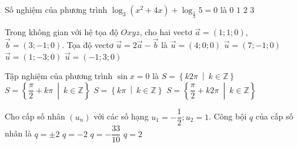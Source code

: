 \begin{ex}%
	Số nghiệm của phương trình $\log_3(x^2 + 4x) + \log_{\frac{1}{3}} 5 = 0$ là
	\choice
	{$0$}
	{$1$}
	{\True $2$}
	{$3$}
\end{ex}

\begin{ex}%
	Trong không gian với hệ tọa độ $Oxyz$, cho hai vectơ $\vec{a} = (1;1;0)$, $\vec{b} = (3;-1;0)$. Tọa độ vectơ $\vec{u} = 2\vec{a} - \vec{b}$ là
	\choice
	{$\vec{u} = (4;0;0)$}
	{$\vec{u} = (7;-1;0)$}
	{$\vec{u} = (1;-3;0)$}
	{\True $\vec{u} = (-1;3;0)$}
\end{ex}

\begin{ex}%
	Tập nghiệm của phương trình $\sin x = 0$ là
	\choice
	{$S = \left\{k2\pi \ \middle| \ k \in \mathbb{Z}\right\}$}
	{$S = \left\{\dfrac{\pi}{2} + k\pi \ \middle| \ k \in \mathbb{Z}\right\}$}
	{\True $S = \left\{k\pi \ \middle| \ k \in \mathbb{Z}\right\}$}
	{$S = \left\{\dfrac{\pi}{2} + k2\pi \ \middle| \ k \in \mathbb{Z}\right\}$}
\end{ex}

\begin{ex}%
	Cho cấp số nhân $(u_n)$ với các số hạng $u_1 = -\dfrac{1}{2}; u_2 = 1$. Công bội $q$ của cấp số nhân là
	\choice
	{$q = \pm 2$}
	{\True $q = -2$}
	{$q = -\dfrac{33}{10}$}
	{$q = 2$}
\end{ex}


